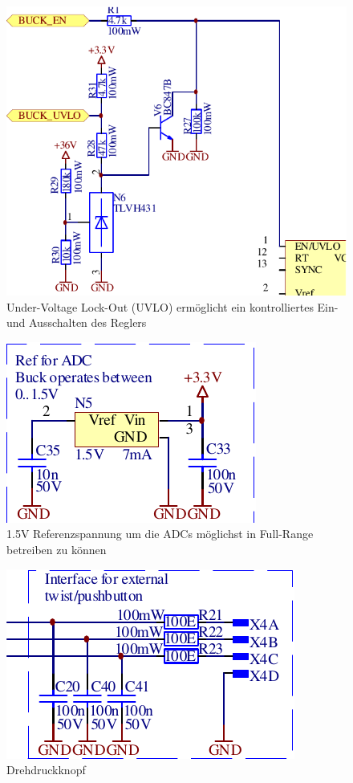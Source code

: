 \begin{figure}[H]
    \center
    \includegraphics[width=.6\textwidth]{images/circuit/uvlo.pdf}
    \caption{Under-Voltage Lock-Out (UVLO) erm\"oglicht ein kontrolliertes Ein- und Ausschalten des Reglers}
    \label{fig:circuit:uvlo}
\end{figure}

\begin{figure}[H]
    \center
    \includegraphics[width=.4\textwidth]{images/circuit/vref.pdf}
    \caption{1.5V Referenzspannung um die ADCs m\"oglichst in Full-Range betreiben zu k\"onnen}
    \label{fig:circuit:vref}
\end{figure}

\begin{figure}[H]
    \center
    \includegraphics[width=.4\textwidth]{images/circuit/pushbutton.pdf}
    \caption{Drehdruckknopf}
    \label{fig:circuit:pushbutton}
\end{figure}

